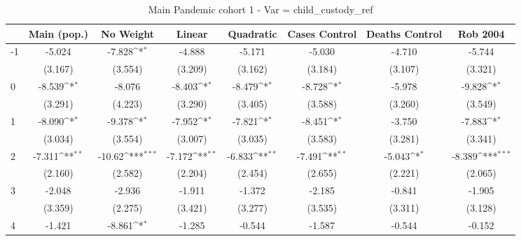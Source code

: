 \documentclass{article}
\begin{document}
{
\def\sym#1{\ifmmode^{#1}\else\(^{#1}\)\fi}
\begin{longtable}{l*{7}{c}}
\caption{Main Pandemic cohort 1 - Var = child\_custody\_ref}\\
\hline\hline\endfirsthead\hline\endhead\hline\endfoot\endlastfoot
                &\multicolumn{1}{c}{Main (pop.)}&\multicolumn{1}{c}{No Weight}&\multicolumn{1}{c}{Linear}&\multicolumn{1}{c}{Quadratic}&\multicolumn{1}{c}{Cases Control}&\multicolumn{1}{c}{Deaths Control}&\multicolumn{1}{c}{Rob 2004}\\
\hline
-1              &   -5.024         &   -7.828\sym{*}  &   -4.888         &   -5.171         &   -5.030         &   -4.710         &   -5.744         \\
                &  (3.167)         &  (3.554)         &  (3.209)         &  (3.162)         &  (3.184)         &  (3.107)         &  (3.321)         \\
0               &   -8.539\sym{*}  &   -8.076         &   -8.403\sym{*}  &   -8.479\sym{*}  &   -8.728\sym{*}  &   -5.978         &   -9.828\sym{*}  \\
                &  (3.291)         &  (4.223)         &  (3.290)         &  (3.405)         &  (3.588)         &  (3.260)         &  (3.549)         \\
1               &   -8.090\sym{*}  &   -9.378\sym{*}  &   -7.952\sym{*}  &   -7.821\sym{*}  &   -8.451\sym{*}  &   -3.750         &   -7.883\sym{*}  \\
                &  (3.034)         &  (3.554)         &  (3.007)         &  (3.035)         &  (3.583)         &  (3.281)         &  (3.341)         \\
2               &   -7.311\sym{**} &   -10.62\sym{***}&   -7.172\sym{**} &   -6.833\sym{**} &   -7.491\sym{**} &   -5.043\sym{*}  &   -8.389\sym{***}\\
                &  (2.160)         &  (2.582)         &  (2.204)         &  (2.454)         &  (2.655)         &  (2.221)         &  (2.065)         \\
3               &   -2.048         &   -2.936         &   -1.911         &   -1.372         &   -2.185         &   -0.841         &   -1.905         \\
                &  (3.359)         &  (2.275)         &  (3.421)         &  (3.277)         &  (3.535)         &  (3.311)         &  (3.128)         \\
4               &   -1.421         &   -8.861\sym{*}  &   -1.285         &   -0.544         &   -1.587         &   -0.544         &   -0.152         \\

\end{longtable}}
\end{document}

